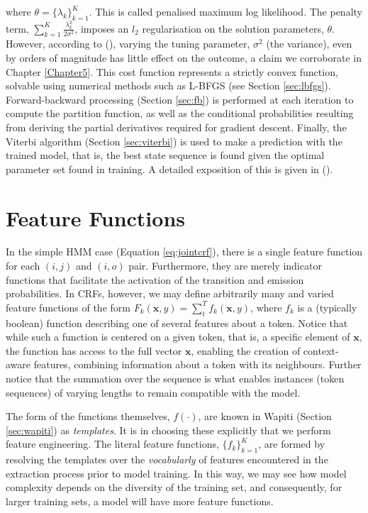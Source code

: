 where $\theta = \{\lambda_k\}_{k=1}^K$. This is called penalised maximum log likelihood. The penalty term, $\sum_{k=1}^K\frac{\lambda_k^2}{2\sigma^2}$, imposes an $l_2$ regularisation on the solution parameters, $\theta$. However, according to (\cite{mccallum2000maximum}), varying the tuning parameter, $\sigma^2$ (the variance), even by orders of magnitude has little effect on the outcome, a claim we corroborate in Chapter \ref{Chapter5}. This cost function represents a strictly convex function, solvable using numerical methods such as L-BFGS (see Section \ref{sec:lbfgs}). Forward-backward processing (Section \ref{sec:fb}) is performed at each iteration to compute the partition function, as well as the conditional probabilities resulting from deriving the partial derivatives required for gradient descent. Finally, the Viterbi algorithm (Section \ref{sec:viterbi}) is used to make a prediction with the trained model, that is, the best state sequence is found given the optimal parameter set found in training. A detailed exposition of this is given in (\cite{mccallum2000maximum}).

\section{Feature Functions}
\label{sec:featurefunctions}

In the simple HMM case (Equation \ref{eq:jointcrf}), there is a single feature function for each $(i, j)$ and $(i, o)$ pair. Furthermore, they are merely indicator functions that facilitate the activation of the transition and emission probabilities. In CRFs, however, we may define arbitrarily many and varied feature functions of the form $F_k(\mathbf{x}, y) = \sum_t^T f_k(\mathbf{x}, y)$, where $f_k$ is a (typically boolean) function describing one of several features about a token. Notice that while such a function is centered on a given token, that is, a specific element of $\mathbf{x}$, the function has access to the full vector $\mathbf{x}$, enabling the creation of context-aware features, combining information about a token with its neighbours. Further notice that the summation over the sequence is what enables instances (token sequences) of varying lengths to remain compatible with the model.

The form of the functions themselves, $f(\cdot)$, are known in Wapiti (Section \ref{sec:wapiti}) as \emph{templates}. It is in choosing these explicitly that we perform feature engineering. The literal feature functions, $\{f_k\}_{k=1}^K$, are formed by resolving the templates over the \emph{vocabularly} of features encountered in the extraction process prior to model training. In this way, we may see how model complexity depends on the diversity of the training set, and consequently, for larger training sets, a model will have more feature functions. 

